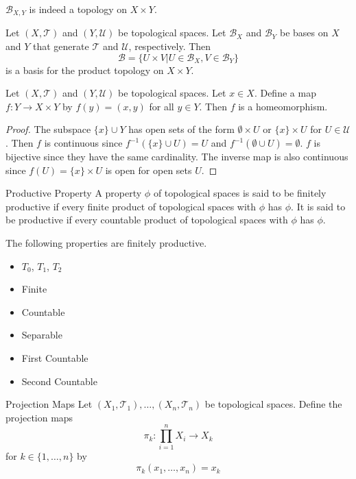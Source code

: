 \begin{lmm}{}{} $\mathcal{B}_{X,Y}$ is indeed a topology on $X\times Y$. 
\end{lmm}

\begin{prp}{}{} Let $(X,\mathcal{T})$ and $(Y,\mathcal{U})$ be topological spaces. Let $\mathcal{B}_X$ and $\mathcal{B}_Y$ be bases on $X$ and $Y$ that generate $\mathcal{T}$ and $\mathcal{U}$, respectively. Then $$\mathcal{B}=\{U\times V|U\in\mathcal{B}_X, V\in\mathcal{B}_Y\}$$ is a basis for the product topology on $X\times Y$. 
\end{prp}

\begin{prp}{}{} Let $(X,\mathcal{T})$ and $(Y,\mathcal{U})$ be topological spaces. Let $x\in X$. Define a map $f:Y\to X\times Y$ by $f(y)=(x,y)$ for all $y\in Y$. Then $f$ is a homeomorphism. \tcbline
\begin{proof}
The subspace $\{x\}\cup Y$ has open sets of the form $\emptyset\times U$ or $\{x\}\times U$ for $U\in\mathcal{U}$. Then $f$ is continuous since $f^{-1}(\{x\}\cup U)=U$ and $f^{-1}(\emptyset\cup U)=\emptyset$. $f$ is bijective since they have the same cardinality. The inverse map is also continuous since $f(U)=\{x\}\times U$ is open for open sets $U$. 
\end{proof}
\end{prp}

\begin{defn}{Productive Property}{} A property $\phi$ of topological spaces is said to be finitely productive if every finite product of topological spaces with $\phi$ has $\phi$. It is said to be productive if every countable product of topological spaces with $\phi$ has $\phi$. 
\end{defn}

\begin{prp}{}{} The following properties are finitely productive. 
\begin{itemize}
\item $T_0$, $T_1$, $T_2$
\item Finite
\item Countable
\item Separable
\item First Countable
\item Second Countable
\end{itemize}
\end{prp}

\begin{defn}{Projection Maps}{} Let $(X_1,\mathcal{T}_1),\dots,(X_n,\mathcal{T}_n)$ be topological spaces. Define the projection maps $$\pi_k:\prod_{i=1}^nX_i\to X_k$$ for $k\in\{1,\dots,n\}$ by $$\pi_k(x_1,\dots,x_n)=x_k$$
\end{defn}

